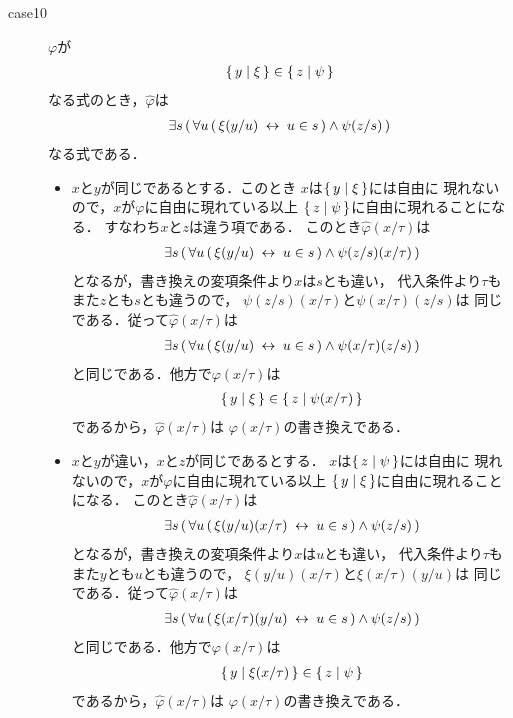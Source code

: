 \begin{metaprf}[第一]
\begin{description}
\begin{description}
					\item[case10] $\varphi$が
						\begin{align}
							\{\, y \mid \xi\, \} \in \{\, z \mid \psi\, \}
						\end{align}
						なる式のとき，$\widehat{\varphi}$は
						\begin{align}
							\exists s\, (\, \forall u\, (\, \xi(y/u) \hspace{0.25em}\leftrightarrow\hspace{0.25em} u \in s\, ) \wedge \psi(z/s)\, )
						\end{align}
						なる式である．
						\begin{itemize}
							\item $x$と$y$が同じであるとする．このとき
								$x$は$\{\, y \mid \xi\, \}$には自由に
								現れないので，$x$が$\varphi$に自由に現れている以上
								$\{\, z \mid \psi\, \}$に自由に現れることになる．
								すなわち$x$と$z$は違う項である．
								このとき$\widehat{\varphi}(x/\tau)$は
								\begin{align}
									\exists s\, (\, \forall u\, (\, \xi(y/u) \hspace{0.25em}\leftrightarrow\hspace{0.25em} u \in s\, ) \wedge \psi(z/s)(x/\tau)\, )
								\end{align}
								となるが，書き換えの変項条件より$x$は$s$とも違い，
								代入条件より$\tau$もまた$z$とも$s$とも違うので，
								$\psi(z/s)(x/\tau)$と$\psi(x/\tau)(z/s)$は
								同じである．従って$\widehat{\varphi}(x/\tau)$は
								\begin{align}
									\exists s\, (\, \forall u\, (\, \xi(y/u) \hspace{0.25em}\leftrightarrow\hspace{0.25em} u \in s\, ) \wedge \psi(x/\tau)(z/s)\, )
								\end{align}
								と同じである．他方で$\varphi(x/\tau)$は
								\begin{align}
									\{\, y \mid \xi\, \} \in \{\, z \mid \psi(x/\tau)\, \}
								\end{align}
								であるから，$\widehat{\varphi}(x/\tau)$は
								$\varphi(x/\tau)$の書き換えである．
								
							\item $x$と$y$が違い，$x$と$z$が同じであるとする．
								$x$は$\{\, z \mid \psi\, \}$には自由に
								現れないので，$x$が$\varphi$に自由に現れている以上
								$\{\, y \mid \xi\, \}$に自由に現れることになる．
								このとき$\widehat{\varphi}(x/\tau)$は
								\begin{align}
									\exists s\, (\, \forall u\, (\, \xi(y/u)(x/\tau) \hspace{0.25em}\leftrightarrow\hspace{0.25em} u \in s\, ) \wedge \psi(z/s)\, )
								\end{align}
								となるが，書き換えの変項条件より$x$は$u$とも違い，
								代入条件より$\tau$もまた$y$とも$u$とも違うので，
								$\xi(y/u)(x/\tau)$と$\xi(x/\tau)(y/u)$は
								同じである．従って$\widehat{\varphi}(x/\tau)$は
								\begin{align}
									\exists s\, (\, \forall u\, (\, \xi(x/\tau)(y/u) \hspace{0.25em}\leftrightarrow\hspace{0.25em} u \in s\, ) \wedge \psi(z/s)\, )
								\end{align}
								と同じである．他方で$\varphi(x/\tau)$は
								\begin{align}
									\{\, y \mid \xi(x/\tau)\, \} \in \{\, z \mid \psi\, \}
								\end{align}
								であるから，$\widehat{\varphi}(x/\tau)$は
								$\varphi(x/\tau)$の書き換えである．
								

\end{itemize}
\end{description}
\end{description}
\end{metaprf}
